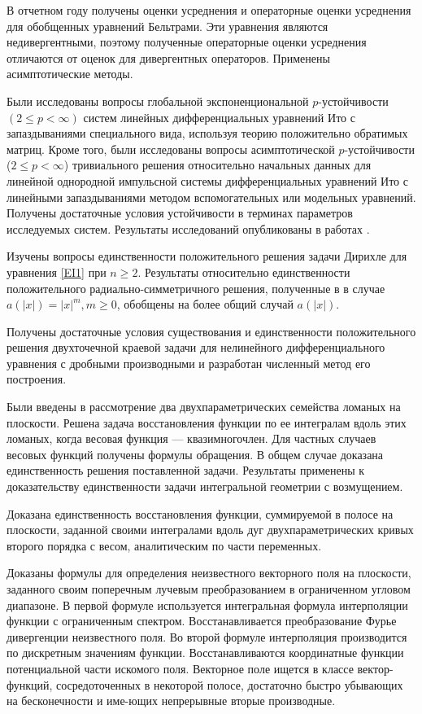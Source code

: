 В отчетном году получены оценки усреднения и операторные оценки усреднения для обобщенных уравнений Бельтрами. Эти уравнения являются недивергентными, поэтому полученные операторные оценки усреднения  отличаются от оценок для дивергентных операторов. Применены асимптотические методы.

Были исследованы вопросы глобальной экспоненциональной $p$-устой\-чи\-вос\-ти $(2 \le p < \infty)$ систем линейных дифференциальных уравнений Ито с запаздываниями
специального вида, используя теорию положительно обратимых матриц.
Кроме того, были исследованы вопросы асимптотической
$p$-устойчивости ($2 \le p < \infty $) тривиального решения
относительно начальных данных для линейной однородной импульсной
системы дифференциальных уравнений Ито с линейными запаздываниями
методом вспомогательных или модельных уравнений. Получены достаточные условия устойчивости в терминах параметров исследуемых систем. Результаты исследований опубликованы в работах \cite{kad11,kad12,kad13,kad14}.

Изучены вопросы единственности положительного решения задачи Дирихле
для уравнения \eqref{EI1} при $n\geq 2.$  Результаты
относительно единственности положительного радиально-симметричного
решения, полученные в \cite{LitEI7, LitEI8, LitEI9} в случае
$a(|x|)=|x|^m, m\geq 0 $, обобщены на более общий случай $ a(|x|).$

Получены достаточные условия существования и единственности
 положительного решения двухточечной краевой задачи для нелинейного
 дифференциального уравнения с дробными производными и разработан
 численный метод его построения.
 
Были введены в рассмотрение два двухпараметрических семейства ломаных на плоскости. Решена задача восстановления функции по ее интегралам вдоль этих ломаных, когда весовая функция --- квазимногочлен. Для частных случаев весовых функций получены формулы обращения. В общем случае доказана единственность решения поставленной задачи. Результаты применены к доказательству единственности задачи интегральной геометрии с возмущением.

Доказана единственность восстановления функции, суммируемой в полосе на плоскости, заданной своими интегралами вдоль дуг двухпараметрических кривых второго порядка с весом, аналитическим по части переменных.

Доказаны формулы для определения неизвестного векторного поля на плоскости, заданного своим поперечным лучевым преобразованием в ограниченном угловом диапазоне. В первой формуле используется интегральная формула интерполяции функции с ограниченным спектром. Восстанавливается преобразование Фурье дивергенции неизвестного поля. Во второй формуле интерполяция производится по дискретным значениям функции. Восстанавливаются координатные функции потенциальной части искомого поля. Векторное поле ищется в классе вектор-функций, сосредоточенных в некоторой полосе, достаточно быстро убывающих на бесконечности и име-ющих непрерывные вторые производные.





